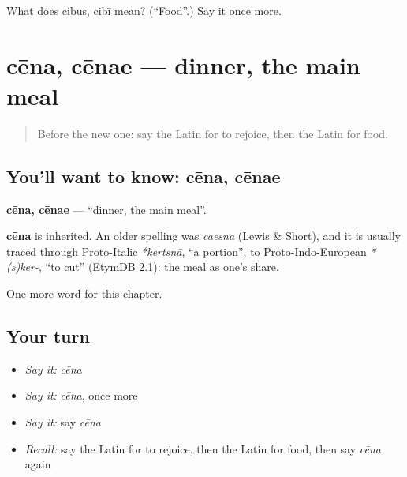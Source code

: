\begin{tcolorbox}[breakable,colback=teal!4,colframe=teal!35!black,title={Before you move on}]
What does cibus, cibī mean? (\textquotedblleft{}Food\textquotedblright{}.) Say it once more.
\end{tcolorbox}
\section[cēna, cēnae]{cēna, cēnae — dinner, the main meal}

\label{lesson:LA-C79-cena}



\begin{quote}
Before the new one: say the Latin for to rejoice, then the Latin for food.
\end{quote}

\subsection*{You'll want to know: cēna, cēnae}
\textbf{cēna, cēnae} — \textquotedblleft{}dinner, the main meal\textquotedblright{}.

\begin{cousinweb}
\textbf{cēna} is inherited. An older spelling was \emph{caesna} (Lewis \& Short), and it is usually traced through Proto-Italic \emph{*kertsnā}, \textquotedblleft{}a portion\textquotedblright{}, to Proto-Indo-European \emph{*(s)ker-}, \textquotedblleft{}to cut\textquotedblright{} (EtymDB 2.1): the meal as one's share.
\end{cousinweb}

\begin{grammarlens}[title={What you've built}]
One more word for this chapter.
\end{grammarlens}

\subsection*{Your turn}
\begin{itemize}
\raggedright
  \item \emph{Say it:} \emph{cēna}
  \item \emph{Say it:} \emph{cēna}, once more
  \item \emph{Say it:} say \emph{cēna}
  \item \emph{Recall:} say the Latin for to rejoice, then the Latin for food, then say \emph{cēna} again
\end{itemize}

